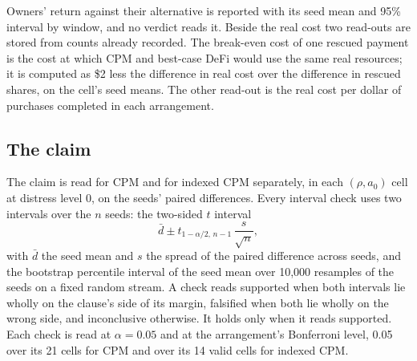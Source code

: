 Owners' return against their alternative is reported with its seed mean and 95\% interval by window, and no verdict
reads it. Beside the real cost two read-outs are stored from counts already recorded. The break-even cost of one
rescued payment is the cost at which CPM and best-case DeFi would use the same real resources; it is computed as \$2 less
the difference in real cost over the difference in rescued shares, on the cell's seed means. The other read-out is the real cost per
dollar of purchases completed in each arrangement.

\subsection{The claim}

The claim is read for CPM and for indexed CPM separately, in each $(\rho, a_{0})$ cell at distress level 0, on the
seeds' paired differences. Every interval check uses two intervals over the $n$ seeds: the two-sided $t$ interval
\begin{equation}
  \bar{d} \pm t_{1-\alpha/2,\,n-1}\,\frac{s}{\sqrt{n}},
  \label{eq:tinterval}
\end{equation}
with $\bar{d}$ the seed mean and $s$ the spread of the paired difference across seeds, and the bootstrap percentile
interval of the seed mean over 10,000 resamples of the seeds on a fixed random stream. A check reads supported
when both intervals lie wholly on the clause's side of its margin, falsified when both lie wholly on the wrong
side, and inconclusive otherwise. It holds only when it reads supported. Each check is read at $\alpha = 0.05$ and at
the arrangement's Bonferroni level, 0.05 over its 21 cells for CPM and over its 14 valid cells for indexed CPM.

